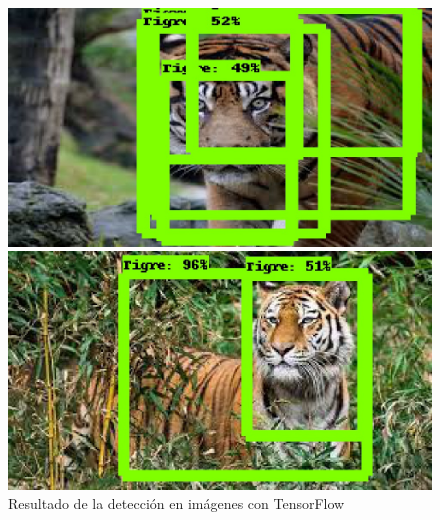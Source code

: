 \begin{figure}[H]
\begin{minipage}{0.46\textwidth}
    \centering
    \includegraphics[width=\linewidth]{figs/tigre_4.jpeg}
  \end{minipage}
  \hspace{2mm}
  \begin{minipage}{0.46\textwidth}
    \centering
    \includegraphics[width=\linewidth]{figs/tigre_5.jpeg}
  \end{minipage}
  \caption{Resultado de la detección en imágenes con TensorFlow}
  \label{fig:deteccion_tensorflow_tigres}
  \end{figure}
 
